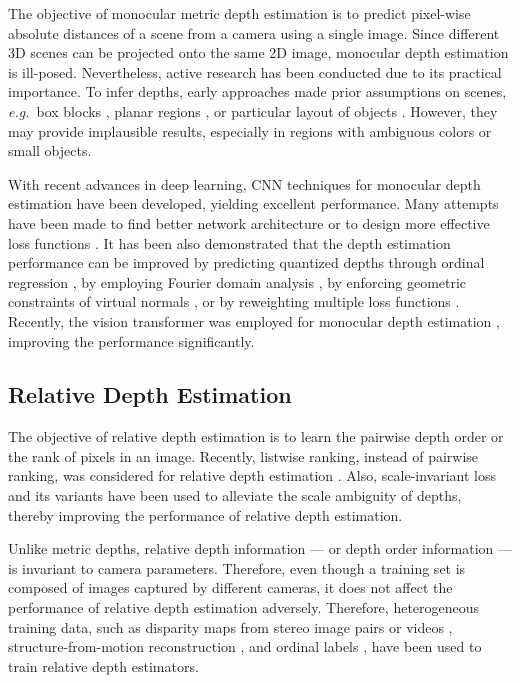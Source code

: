 \documentclass[runningheads]{llncs}
\newcommand{\eg}{\textit{e.g.}}
\begin{document}
The objective of monocular metric depth estimation is to predict pixel-wise absolute distances of a scene from a camera using a single image. Since different 3D scenes can be projected onto the same 2D image, monocular depth estimation is ill-posed. Nevertheless, active research has been conducted due to its practical importance. To infer depths, early approaches made prior assumptions on scenes, \eg\ box blocks \cite{gupta2010eccv}, planar regions \cite{saxena2008make3d}, or particular layout of objects \cite{gupta2010nips}. However, they may provide implausible results, especially in regions with ambiguous colors or small objects.

With recent advances in deep learning, CNN techniques for monocular depth estimation have been developed, yielding excellent performance. Many attempts have been made to find better network architecture \cite{eigen2014depth, laina2016deeper, xu2017multi, heo2018monocular, chen2019structure} or to design more effective loss functions \cite{eigen2015predicting, chen2016single, laina2016deeper, hu2019revisiting}. It has been also demonstrated that the depth estimation performance can be improved by predicting quantized depths through ordinal regression \cite{fu2018deep}, by employing Fourier domain analysis \cite{lee2018single}, by enforcing geometric constraints of virtual normals \cite{yin2019enforcing}, or by reweighting multiple loss functions \cite{lee2020multi}. Recently, the vision transformer \cite{dosovitskiy2020image} was employed for monocular depth estimation \cite{bhat2021adabins}, improving the performance significantly.


\subsection{Relative Depth Estimation}
The objective of relative depth estimation is to learn the pairwise depth order \cite{zoran2015learning} or the rank of pixels \cite{chen2016single, xian2020structure} in an image. Recently, listwise ranking, instead of pairwise ranking, was considered for relative depth estimation \cite{lienen2021monocular}. Also, scale-invariant loss \cite{eigen2014depth} and its variants \cite{li2018megadepth, li2019learning, wang2019web, ranftl2020} have been used to alleviate the scale ambiguity of depths, thereby improving the performance of relative depth estimation.

Unlike metric depths, relative depth information --- or depth order information --- is invariant to camera parameters. Therefore, even though a training set is composed of images captured by different cameras, it does not affect the performance of relative depth estimation adversely. Therefore, heterogeneous training data, such as disparity maps from stereo image pairs \cite{wang2019web, xian2018monocular, xian2020structure} or videos \cite{ranftl2020}, structure-from-motion reconstruction \cite{li2018megadepth, li2019learning}, and ordinal labels \cite{chen2016single}, have been used to train relative depth estimators.
\end{document}
